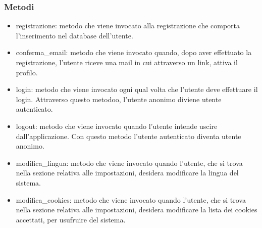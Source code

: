 \documentclass[a4paper,12pt]{article}
\begin{document}
\subsubsection*{Metodi}
\begin{itemize} \setlength\itemsep{0.01em}
\item {\ttfamily registrazione}: metodo che viene invocato alla registrazione che comporta l'inserimento nel database dell'utente.
\item {\ttfamily conferma\_email}: metodo che viene invocato quando, dopo aver effettuato la registrazione, l'utente riceve una mail in cui attraverso un link, attiva il profilo. 
\item {\ttfamily login}: metodo che viene invocato ogni qual volta che l'utente deve effettuare il login. Attraverso questo metodoo, l'utente anonimo diviene utente autenticato.
\item {\ttfamily logout}: metodo che viene invocato quando l'utente intende uscire dall'applicazione. Con questo metodo l'utente autenticato diventa utente anonimo.
\item {\ttfamily modifica\_lingua}: metodo che viene invocato quando l'utente, che si trova nella sezione relativa alle impostazioni, desidera modificare la lingua del sistema.
\item {\ttfamily modifica\_cookies}:  metodo che viene invocato quando l'utente, che si trova nella sezione relativa alle impostazioni, desidera modificare la lista dei cookies accettati, per usufruire del sistema.
\end{itemize}
\end{document}
